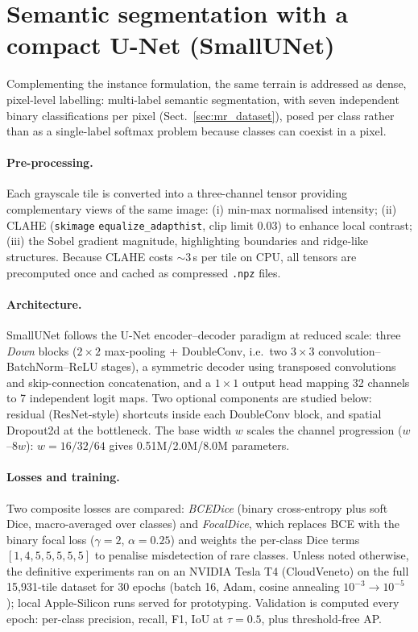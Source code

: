 \section{Semantic segmentation with a compact U-Net (SmallUNet)}
\label{sec:moon_recognition}

Complementing the instance formulation, the same terrain is addressed as dense, pixel-level labelling: multi-label semantic segmentation, with seven independent binary classifications per pixel (Sect.~\ref{sec:mr_dataset}), posed per class rather than as a single-label softmax problem because classes can coexist in a pixel.

\paragraph{Pre-processing.}
Each grayscale tile is converted into a three-channel tensor providing complementary views of the same image: (i) min-max normalised intensity; (ii) CLAHE (\texttt{skimage} \texttt{equalize\_adapthist}, clip limit 0.03) to enhance local contrast; (iii) the Sobel gradient magnitude, highlighting boundaries and ridge-like structures. Because CLAHE costs ${\sim}3$\,s per tile on CPU, all tensors are precomputed once and cached as compressed \texttt{.npz} files.

\paragraph{Architecture.}
SmallUNet follows the U-Net encoder--decoder paradigm \citep{ronneberger2015unet} at reduced scale: three \emph{Down} blocks ($2\times2$ max-pooling + DoubleConv, i.e.\ two $3\times3$ convolution--BatchNorm--ReLU stages), a symmetric decoder using transposed convolutions and skip-connection concatenation, and a $1\times1$ output head mapping 32 channels to 7 independent logit maps. Two optional components are studied below: residual (ResNet-style) shortcuts inside each DoubleConv block, and spatial Dropout2d at the bottleneck. The base width $w$ scales the channel progression ($w$--$8w$): $w=16/32/64$ gives 0.51M/2.0M/8.0M parameters.

\paragraph{Losses and training.}
Two composite losses are compared: \emph{BCEDice} (binary cross-entropy plus soft Dice, macro-averaged over classes) and \emph{FocalDice}, which replaces BCE with the binary focal loss \citep{lin2017focal} ($\gamma=2$, $\alpha=0.25$) and weights the per-class Dice terms $[1,4,5,5,5,5,5]$ to penalise misdetection of rare classes. Unless noted otherwise, the definitive experiments ran on an NVIDIA Tesla T4 (CloudVeneto) on the full 15{,}931-tile dataset for 30 epochs (batch 16, Adam, cosine annealing $10^{-3}\!\to\!10^{-5}$); local Apple-Silicon runs served for prototyping. Validation is computed every epoch: per-class precision, recall, F1, IoU at $\tau=0.5$, plus threshold-free AP.

